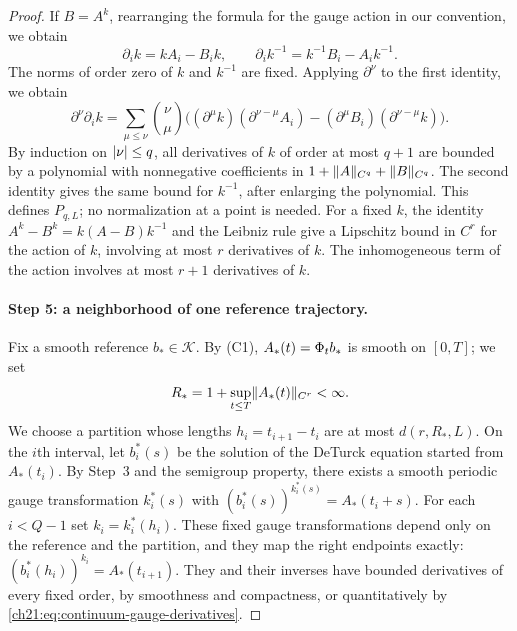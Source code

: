 \begin{proof}
If $B=A^k$, rearranging the formula for the gauge action in our convention, we obtain
\begin{equation}\label{ch21:eq:continuum-gauge-derivatives}
 \partial_ik=kA_i-B_ik,\qquad\partial_ik^{-1}=k^{-1}B_i-A_ik^{-1}.
\end{equation}
The norms of order zero of $k$ and $k^{-1}$ are fixed. Applying $\partial^\nu$ to the first identity, we obtain
\[
 \partial^\nu\partial_ik=\sum_{\mu\le\nu}\binom\nu\mu\bigl((\partial^\mu k)(\partial^{\nu-\mu}A_i)-(\partial^\mu B_i)(\partial^{\nu-\mu}k)\bigr).
\]
By induction on $\lvert \nu\rvert\le q$, all derivatives of $k$ of order at most $q+1$ are bounded by a polynomial with nonnegative coefficients in $1+\lVert A\rVert_{C^q}+\lVert B\rVert_{C^q}$. The second identity gives the same bound for $k^{-1}$, after enlarging the polynomial. This defines $P_{q,L}$; no normalization at a point is needed. For a fixed $k$, the identity $A^k-B^k=k(A-B)k^{-1}$ and the Leibniz rule give a Lipschitz bound in $C^r$ for the action of $k$, involving at most $r$ derivatives of $k$. The inhomogeneous term of the action involves at most $r+1$ derivatives of $k$.

\paragraph{Step 5: a neighborhood of one reference trajectory.}
Fix a smooth reference $b_*\in\mathscr K$. By (C1), $A_*(t)=\Phi_tb_*$ is smooth on $[0,T]$; we set
\[
 R_*=1+\sup_{t\le T}\lVert A_*(t)\rVert_{C^r}<\infty .
\]
We choose a partition whose lengths $h_i=t_{i+1}-t_i$ are at most $d(r,R_*,L)$. On the $i$th interval, let $b_i^*(s)$ be the solution of the DeTurck equation started from $A_*(t_i)$. By Step~3 and the semigroup property, there exists a smooth periodic gauge transformation $k_i^*(s)$ with $(b_i^*(s))^{k_i^*(s)}=A_*(t_i+s)$. For each $i<Q-1$ set $k_i=k_i^*(h_i)$. These fixed gauge transformations depend only on the reference and the partition, and they map the right endpoints exactly: $(b_i^*(h_i))^{k_i}=A_*(t_{i+1})$. They and their inverses have bounded derivatives of every fixed order, by smoothness and compactness, or quantitatively by \eqref{ch21:eq:continuum-gauge-derivatives}.


\end{proof}
